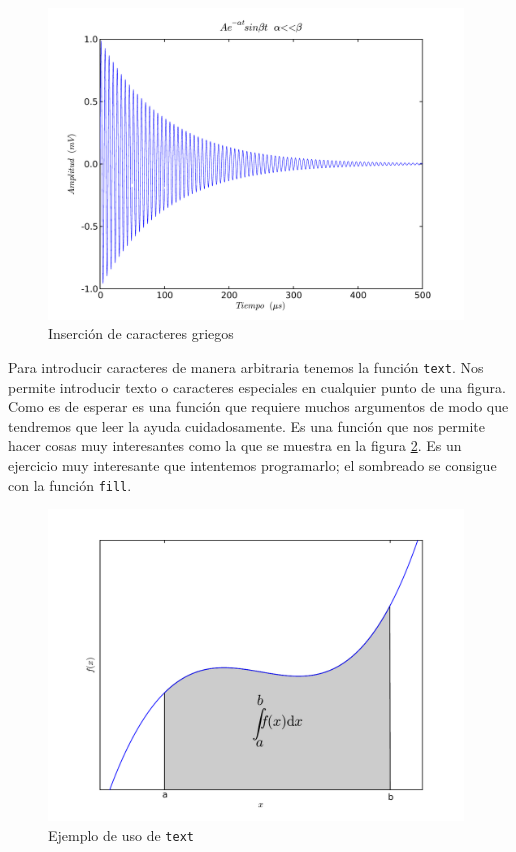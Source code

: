\begin{figure}[h]
  \centering{}

  \includegraphics[width=11cm,keepaspectratio]{figuras/figuraejemplo5}


  \caption{\label{cap:Inserci=F3n-de-caracteres}Inserción de
    caracteres griegos}
\end{figure}

Para introducir caracteres de manera arbitraria tenemos la función
\texttt{text}. Nos permite introducir texto o caracteres especiales en
cualquier punto de una figura. Como es de esperar es una función que
requiere muchos argumentos de modo que tendremos que leer la ayuda
cuidadosamente. Es una función que nos permite hacer cosas muy
interesantes como la que se muestra en la figura
\ref{cap:Ejemplo-text}. Es un ejercicio muy interesante que intentemos
programarlo; el sombreado se consigue con la función
\texttt{fill}.

%
\begin{figure}[H]
  \centering{}

  \includegraphics[width=11cm,
  keepaspectratio]{figuras/figuraejemplo6}


  \caption{\label{cap:Ejemplo-text}Ejemplo de uso de \texttt{text}}
\end{figure}



